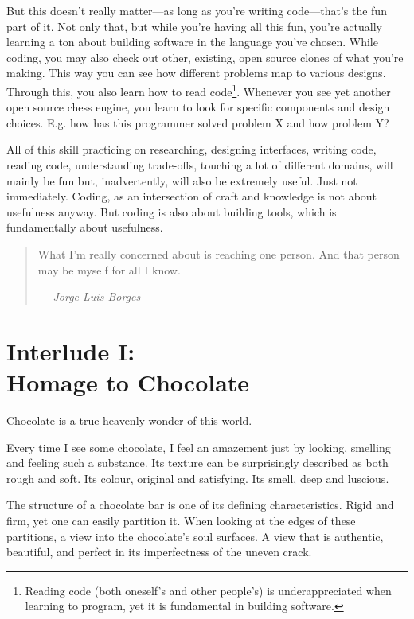 But this doesn’t really matter—as long as you’re writing code—that’s the fun part of it. Not only that, but while you’re having all this fun, you’re actually learning a ton about building software in the language you’ve chosen. While coding, you may also check out other, existing, open source clones of what you’re making. This way you can see how different problems map to various designs. Through this, you also learn how to read code\footnote{Reading code (both oneself’s and other people’s) is underappreciated when learning to program, yet it is fundamental in building software.}. Whenever you see yet another open source chess engine, you learn to look for specific components and design choices. E.g. how has this programmer solved problem X and how problem Y?

All of this skill practicing on researching, designing interfaces, writing code, reading code, understanding trade-offs, touching a lot of different domains, will mainly be fun but, inadvertently, will also be extremely useful. Just not immediately. Coding, as an intersection of craft and knowledge is not about usefulness anyway. But coding is also about building tools, which is fundamentally about usefulness.

\begin{quote}
    What I’m really concerned about is reaching one person. And that person may be myself for all I know.

    — \emph{Jorge Luis Borges}
\end{quote}

\chapter*{Interlude I:\\Homage to Chocolate}

Chocolate is a true heavenly wonder of this world.

Every time I see some chocolate, I feel an amazement just by looking, smelling and feeling such a substance. Its texture can be surprisingly described as both rough and soft. Its colour, original and satisfying. Its smell, deep and luscious.

The structure of a chocolate bar is one of its defining characteristics. Rigid and firm, yet one can easily partition it. When looking at the edges of these partitions, a view into the chocolate’s soul surfaces. A view that is authentic, beautiful, and perfect in its imperfectness of the uneven crack.

